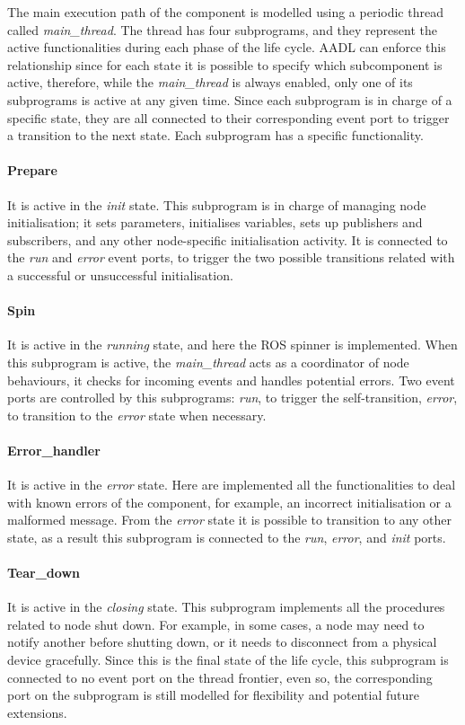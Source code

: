 The main execution path of the component is modelled using a periodic thread called \textit{main\_thread}. The thread has four subprograms, and they represent the active functionalities during each phase of the life cycle. AADL can enforce this relationship since for each state it is possible to specify which subcomponent is active, therefore, while the \textit{main\_thread} is always enabled, only one of its subprograms is active at any given time. Since each subprogram is in charge of a specific state, they are all connected to their corresponding event port to trigger a transition to the next state. Each subprogram has a specific functionality.

\paragraph{Prepare} It is active in the \textit{init} state. This subprogram is in charge of managing node initialisation; it sets parameters, initialises variables, sets up publishers and subscribers, and any other node-specific initialisation activity. It is connected to the \textit{run} and \textit{error} event ports, to trigger the two possible transitions related with a successful or unsuccessful initialisation.
\paragraph{Spin} It is active in the \textit{running} state, and here the ROS spinner is implemented. When this subprogram is active, the \textit{main\_thread} acts as a coordinator of node behaviours, it checks for incoming events and handles potential errors. Two event ports are controlled by this subprograms: \textit{run}, to trigger the self-transition, \textit{error}, to transition to the \textit{error} state when necessary.
\paragraph{Error\_handler} It is active in the \textit{error} state. Here are implemented all the functionalities to deal with known errors of the component, for example, an incorrect initialisation or a malformed message. From the \textit{error} state it is possible to transition to any other state, as a result this subprogram is connected to the \textit{run}, \textit{error}, and \textit{init} ports.
\paragraph{Tear\_down} It is active in the \textit{closing} state. This subprogram implements all the procedures related to node shut down. For example, in some cases, a node may need to notify another before shutting down, or it needs to disconnect from a physical device gracefully. Since this is the final state of the life cycle, this subprogram is connected to no event port on the thread frontier, even so, the corresponding port on the subprogram is still modelled for flexibility and potential future extensions.
\medskip


